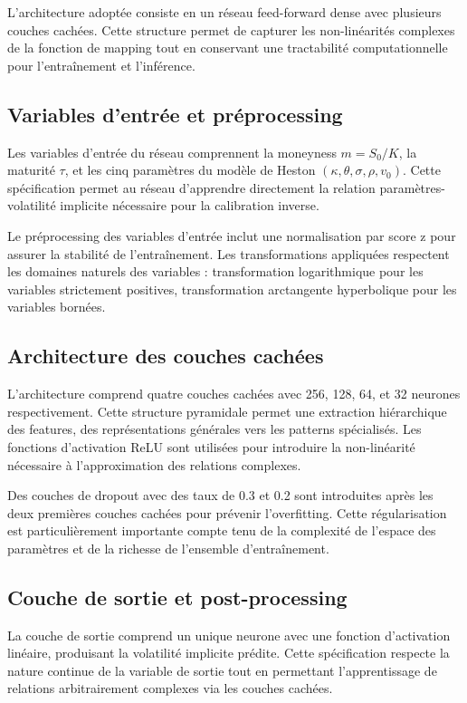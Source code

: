 L'architecture adoptée consiste en un réseau feed-forward dense avec plusieurs couches cachées. Cette structure permet de capturer les non-linéarités complexes de la fonction de mapping tout en conservant une tractabilité computationnelle pour l'entraînement et l'inférence.

\subsection{Variables d'entrée et préprocessing}

Les variables d'entrée du réseau comprennent la moneyness $m = S_0/K$, la maturité $\tau$, et les cinq paramètres du modèle de Heston $(\kappa, \theta, \sigma, \rho, v_0)$. Cette spécification permet au réseau d'apprendre directement la relation paramètres-volatilité implicite nécessaire pour la calibration inverse.

Le préprocessing des variables d'entrée inclut une normalisation par score z pour assurer la stabilité de l'entraînement. Les transformations appliquées respectent les domaines naturels des variables : transformation logarithmique pour les variables strictement positives, transformation arctangente hyperbolique pour les variables bornées.

\subsection{Architecture des couches cachées}

L'architecture comprend quatre couches cachées avec 256, 128, 64, et 32 neurones respectivement. Cette structure pyramidale permet une extraction hiérarchique des features, des représentations générales vers les patterns spécialisés. Les fonctions d'activation ReLU sont utilisées pour introduire la non-linéarité nécessaire à l'approximation des relations complexes.

Des couches de dropout avec des taux de 0.3 et 0.2 sont introduites après les deux premières couches cachées pour prévenir l'overfitting. Cette régularisation est particulièrement importante compte tenu de la complexité de l'espace des paramètres et de la richesse de l'ensemble d'entraînement.

\subsection{Couche de sortie et post-processing}

La couche de sortie comprend un unique neurone avec une fonction d'activation linéaire, produisant la volatilité implicite prédite. Cette spécification respecte la nature continue de la variable de sortie tout en permettant l'apprentissage de relations arbitrairement complexes via les couches cachées.

